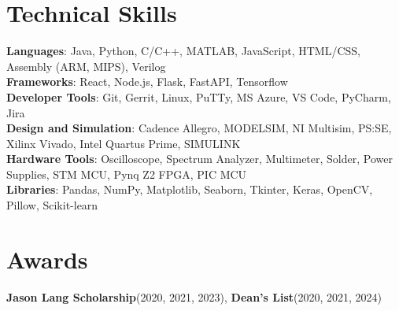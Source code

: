 \documentclass[A4,10pt]{article}
\newcommand{\resumeItem}[1]{
  \item\small{
    {#1 \vspace{-2pt}}
  }
}
\newcommand{\resumeItemListStart}{\begin{itemize}}
\newcommand{\resumeItemListEnd}{\end{itemize}\vspace{-5pt}}
\begin{document}
\section{Technical Skills}
 \begin{itemize}[leftmargin=0.15in, label={}]
    \small{\item{
     \textbf{Languages}{: Java, Python, C/C++, MATLAB, JavaScript, HTML/CSS, Assembly (ARM, MIPS), Verilog} \\
     \textbf{Frameworks}{: React, Node.js, Flask, FastAPI, Tensorflow} \\
     \textbf{Developer Tools}{: Git, Gerrit, Linux, PuTTy, MS Azure, VS Code, PyCharm, Jira} \\
     \textbf{Design and Simulation}{: Cadence Allegro, MODELSIM, NI Multisim, PS:SE, Xilinx Vivado, Intel Quartus Prime, SIMULINK}\\
     \textbf{Hardware Tools}{: Oscilloscope, Spectrum Analyzer, Multimeter, Solder, Power Supplies, STM MCU, Pynq Z2 FPGA, PIC MCU}\\
     \textbf{Libraries}{: Pandas, NumPy, Matplotlib, Seaborn, Tkinter, Keras, OpenCV, Pillow, Scikit-learn}
    }}
 \end{itemize}

\section{Awards}
 \begin{itemize}[leftmargin=0.15in, label={}]
  \small{\item{
   \textbf{Jason Lang Scholarship}{(2020, 2021, 2023),} \textbf{Dean's List}{(2020, 2021, 2024)}
  }}
\end{itemize}

\end{document}
